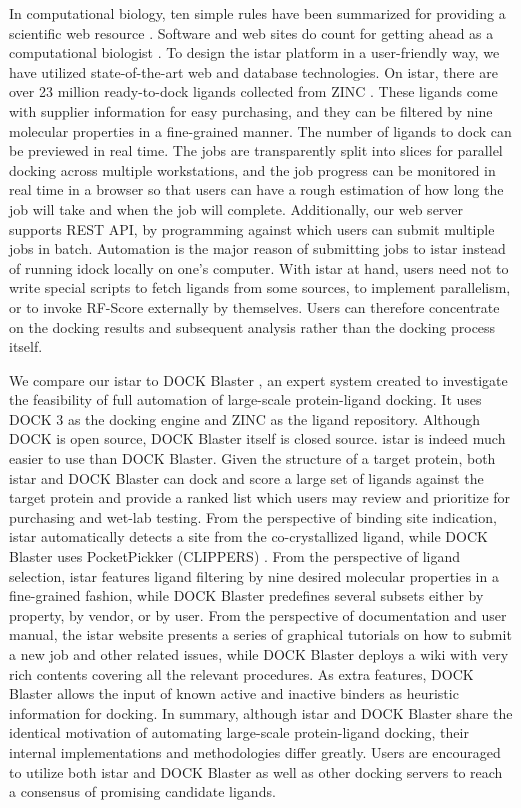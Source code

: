 In computational biology, ten simple rules have been summarized for providing a scientific web resource \citep{677}. Software and web sites do count for getting ahead as a computational biologist \citep{260}. To design the istar platform in a user-friendly way, we have utilized state-of-the-art web and database technologies. On istar, there are over 23 million ready-to-dock ligands collected from ZINC \citep{532,1178}. These ligands come with supplier information for easy purchasing, and they can be filtered by nine molecular properties in a fine-grained manner. The number of ligands to dock can be previewed in real time. The jobs are transparently split into slices for parallel docking across multiple workstations, and the job progress can be monitored in real time in a browser so that users can have a rough estimation of how long the job will take and when the job will complete. Additionally, our web server supports REST API, by programming against which users can submit multiple jobs in batch. Automation is the major reason of submitting jobs to istar instead of running idock locally on one's computer. With istar at hand, users need not to write special scripts to fetch ligands from some sources, to implement parallelism, or to invoke RF-Score externally by themselves. Users can therefore concentrate on the docking results and subsequent analysis rather than the docking process itself.

We compare our istar to DOCK Blaster \citep{557}, an expert system created to investigate the feasibility of full automation of large-scale protein-ligand docking. It uses DOCK 3 \citep{1445} as the docking engine and ZINC \citep{532,1178} as the ligand repository. Although DOCK is open source, DOCK Blaster itself is closed source. istar is indeed much easier to use than DOCK Blaster. Given the structure of a target protein, both istar and DOCK Blaster can dock and score a large set of ligands against the target protein and provide a ranked list which users may review and prioritize for purchasing and wet-lab testing. From the perspective of binding site indication, istar automatically detects a site from the co-crystallized ligand, while DOCK Blaster uses PocketPickker (CLIPPERS) \citep{395}. From the perspective of ligand selection, istar features ligand filtering by nine desired molecular properties in a fine-grained fashion, while DOCK Blaster predefines several subsets either by property, by vendor, or by user. From the perspective of documentation and user manual, the istar website presents a series of graphical tutorials on how to submit a new job and other related issues, while DOCK Blaster deploys a wiki with very rich contents covering all the relevant procedures. As extra features, DOCK Blaster allows the input of known active and inactive binders as heuristic information for docking. In summary, although istar and DOCK Blaster share the identical motivation of automating large-scale protein-ligand docking, their internal implementations and methodologies differ greatly. Users are encouraged to utilize both istar and DOCK Blaster as well as other docking servers to reach a consensus of promising candidate ligands.

